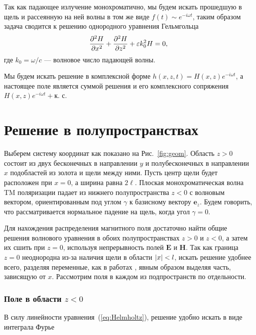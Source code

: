 Так как падающее излучение монохроматично, мы будем искать прошедшую в щель и рассеянную на ней волны в том же виде 
$f(t) \sim e^{-i \omega t}$, таким образом задача сводится к решению однородного уравнения Гельмгольца
 \begin{equation}
   \frac{\partial^2 H}{\partial x^2} +   \frac{\partial^2 H}{\partial z^2} + \varepsilon k_0^2 H = 0,
   \label{eq:Helmholtz}
 \end{equation}
где $k_0 = \omega/c$ --- волновое число падающей волны. 

Мы будем искать решение в комплексной форме $h(x,z,t) = H(x,z)e^{-i \omega t}$, а настоящее поле является суммой решения и его комплексного сопряжения $H(x,z)e^{-i \omega t} + \text{к. с.}$

\section{Решение в полупространствах}
Выберем систему координат как показано на Рис.~\ref{fig:geom}. Область $z > 0$ состоит из двух бесконечных в направлении $y$ и полубесконечных в направлении $x$ подобластей из золота и щели между ними. Пусть центр щели будет расположен при $x = 0$, а ширина равна $2\ell$. Плоская монохроматическая волна TM поляризации падает из нижнего полупространства $z<0$ с волновым вектором, ориентированным под углом $\gamma$ к базисному вектору $\mathbf{e}_z$. Будем говорить, что рассматривается нормальное падение на щель, когда угол $\gamma = 0$.

 Для нахождения распределения магнитного поля достаточно найти общие решения волнового уравнения в обоих полупространствах $z>0$ и $z<0$, а затем их сшить при $z = 0$, используя непрерывность полей $\mathbf{E}$ и $\mathbf{H}$. Так как граница $z=0$ неоднородна из-за наличия щели в области
 $\lvert x\rvert < l$, искать решение удобнее всего, разделяя переменные, как в работах \cite{sturman2010transmission,gorkunov2011transmission}, 
 явным образом выделяя часть, 
 зависящую от $x$. Рассмотрим поля в каждом из подпространств по отдельности.

 \subsubsection{Поле в области $z < 0$}
 
В силу линейности уравнения~(\ref{eq:Helmholtz}), решение удобно искать в виде интеграла Фурье

